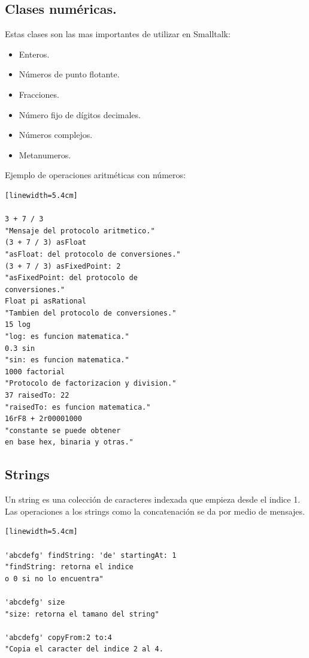 \documentclass[10pt,journal,compsoc]{IEEEtran}
\begin{document}
\subsection{Clases num\'ericas.}
Estas clases son las mas importantes de utilizar en Smalltalk:
\begin{itemize}
	\item Enteros.
	\item N\'umeros de punto flotante.
	\item Fracciones.
	\item N\'umero fijo de d\'igitos decimales.
	\item N\'umeros complejos.
	\item Metanumeros.
\end{itemize}
Ejemplo de operaciones aritm\'eticas con n\'umeros:

\begin{lstlisting}[language=Smalltalk, caption = {Operaciones a n\'umeros.}][linewidth=5.4cm]

3 + 7 / 3                    
"Mensaje del protocolo aritmetico."
(3 + 7 / 3) asFloat          
"asFloat: del protocolo de conversiones."
(3 + 7 / 3) asFixedPoint: 2  
"asFixedPoint: del protocolo de 
conversiones."
Float pi asRational             
"Tambien del protocolo de conversiones."
15 log                          
"log: es funcion matematica."
0.3 sin                         
"sin: es funcion matematica."
1000 factorial                  
"Protocolo de factorizacion y division."
37 raisedTo: 22                 
"raisedTo: es funcion matematica."
16rF8 + 2r00001000              
"constante se puede obtener 
en base hex, binaria y otras."

\end{lstlisting}

\subsection{Strings}
Un string es una colecci\'on de caracteres indexada que empieza desde el indice 1. Las operaciones a los strings como la concatenaci\'on se da por medio de mensajes.

\begin{lstlisting}[language=Smalltalk, caption = {Ejemplo de mensajes con strings.}][linewidth=5.4cm]

'abcdefg' findString: 'de' startingAt: 1    
"findString: retorna el indice 
o 0 si no lo encuentra"

'abcdefg' size
"size: retorna el tamano del string"

'abcdefg' copyFrom:2 to:4
"Copia el caracter del indice 2 al 4.

\end{lstlisting}
\end{document}
